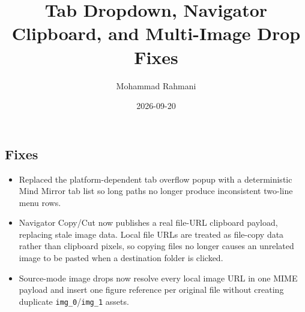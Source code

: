 \documentclass[a4paper]{article}
\title{Tab Dropdown, Navigator Clipboard, and Multi-Image Drop Fixes}
\date{2026-09-20}
\author{Mohammad Rahmani}
\begin{document}
   \maketitle

   \begin{preview}
      \section{Fixes}
      \begin{itemize}
         \item Replaced the platform-dependent tab overflow popup with a deterministic Mind Mirror tab list so long paths no longer produce inconsistent two-line menu rows.
         \item Navigator Copy/Cut now publishes a real file-URL clipboard payload, replacing stale image data. Local file URLs are treated as file-copy data rather than clipboard pixels, so copying files no longer causes an unrelated image to be pasted when a destination folder is clicked.
         \item Source-mode image drops now resolve every local image URL in one MIME payload and insert one figure reference per original file without creating duplicate \texttt{img\_0}/\texttt{img\_1} assets.
      \end{itemize}
   \end{preview}

   
   
\end{document}
